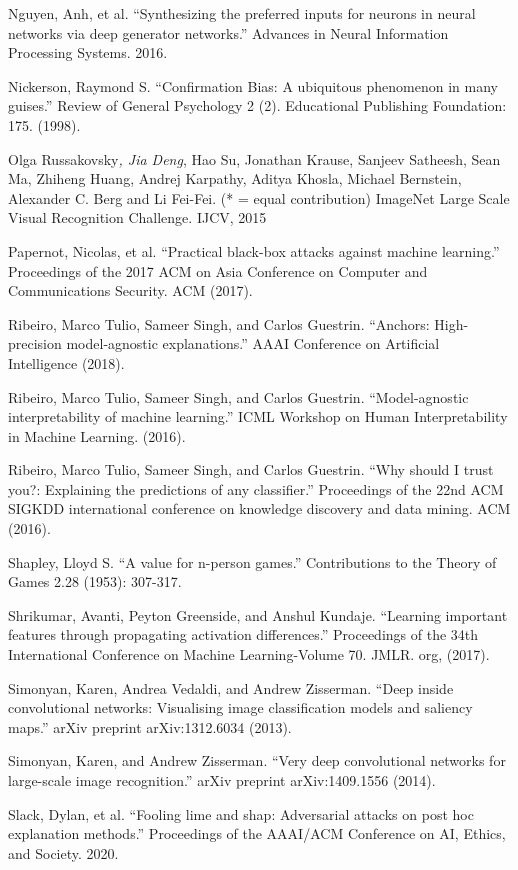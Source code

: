 \documentclass[12pt,]{krantz}
\begin{document}
Nguyen, Anh, et al. ``Synthesizing the preferred inputs for neurons in
neural networks via deep generator networks.'' Advances in Neural
Information Processing Systems. 2016.

Nickerson, Raymond S. ``Confirmation Bias: A ubiquitous phenomenon in
many guises.'' Review of General Psychology 2 (2). Educational
Publishing Foundation: 175. (1998).

Olga Russakovsky\emph{, Jia Deng}, Hao Su, Jonathan Krause, Sanjeev
Satheesh, Sean Ma, Zhiheng Huang, Andrej Karpathy, Aditya Khosla,
Michael Bernstein, Alexander C. Berg and Li Fei-Fei. (* = equal
contribution) ImageNet Large Scale Visual Recognition Challenge. IJCV,
2015

Papernot, Nicolas, et al. ``Practical black-box attacks against machine
learning.'' Proceedings of the 2017 ACM on Asia Conference on Computer
and Communications Security. ACM (2017).

Ribeiro, Marco Tulio, Sameer Singh, and Carlos Guestrin. ``Anchors:
High-precision model-agnostic explanations.'' AAAI Conference on
Artificial Intelligence (2018).

Ribeiro, Marco Tulio, Sameer Singh, and Carlos Guestrin.
``Model-agnostic interpretability of machine learning.'' ICML Workshop
on Human Interpretability in Machine Learning. (2016).

Ribeiro, Marco Tulio, Sameer Singh, and Carlos Guestrin. ``Why should I
trust you?: Explaining the predictions of any classifier.'' Proceedings
of the 22nd ACM SIGKDD international conference on knowledge discovery
and data mining. ACM (2016).

Shapley, Lloyd S. ``A value for n-person games.'' Contributions to the
Theory of Games 2.28 (1953): 307-317.

Shrikumar, Avanti, Peyton Greenside, and Anshul Kundaje. ``Learning
important features through propagating activation differences.''
Proceedings of the 34th International Conference on Machine
Learning-Volume 70. JMLR. org, (2017).

Simonyan, Karen, Andrea Vedaldi, and Andrew Zisserman. ``Deep inside
convolutional networks: Visualising image classification models and
saliency maps.'' arXiv preprint arXiv:1312.6034 (2013).

Simonyan, Karen, and Andrew Zisserman. ``Very deep convolutional
networks for large-scale image recognition.'' arXiv preprint
arXiv:1409.1556 (2014).

Slack, Dylan, et al. ``Fooling lime and shap: Adversarial attacks on
post hoc explanation methods.'' Proceedings of the AAAI/ACM Conference
on AI, Ethics, and Society. 2020.
\end{document}
